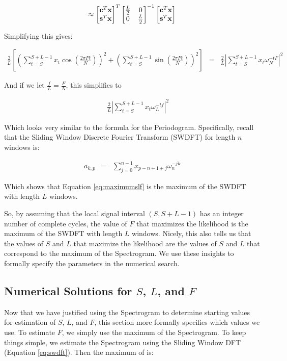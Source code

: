 \documentclass[11pt]{article}
\theoremstyle{plain}
\theoremstyle{definition}
\begin{document}
$$
\approx 
\begin{bmatrix}
{\bf c}^T {\bf x} \\
{\bf s}^T {\bf x} 
\end{bmatrix}^T
\begin{bmatrix}
\frac{L}{2} & 0\\ 
0 & \frac{L}{2}	
\end{bmatrix}^{-1}
\begin{bmatrix}
{\bf c}^T {\bf x} \\
{\bf s}^T {\bf x} 
\end{bmatrix}
$$

\noindent Simplifying this gives:

\begin{eqnarray}
	\frac{2}{L} [(\sum_{t=S}^{S+L-1} x_t \cos(\frac{2 \pi F t}{N}))^2 + (\sum_{t=S}^{S+L-1} \sin(\frac{2 \pi F t}{N}))^2]&=& \frac{2}{L} |\sum_{t=S}^{S+L-1} x_{t} \omega_N^{-tF}|^2 \nonumber 
\end{eqnarray}

\noindent And if we let $\frac{f}{L} = \frac{F}{N}$, this simplifies to

\begin{eqnarray} 
\label{eq:maximumslf}
	&& \frac{2}{L} | \sum_{t=S}^{S+L-1} x_t \omega_L^{-tf}|^2
\end{eqnarray}

\noindent Which looks very similar to the formula for the Periodogram. Specifically, recall that the Sliding Window Discrete Fourier Transform (SWDFT) for length $n$ windows is:

\begin{eqnarray}
\label{eq:swdft}
	a_{k, p} &=& \sum_{j=0}^{n-1} x_{p-n+1+j} \omega_n^{-jk}
\end{eqnarray}

\noindent Which shows that Equation \ref{eq:maximumslf} is the maximum of the SWDFT with length $L$ windows. 

So, by assuming that the local signal interval $(S, S+L-1)$ has an integer number of complete cycles, the value of $F$ that maximizes the likelihood is the maximum of the SWDFT with length $L$ windows. Nicely, this also tells us that the values of $S$ and $L$ that maximize the likelihood are the values of $S$ and $L$ that correspond to the maximum of the Spectrogram. We use these insights to formally specify the parameters in the numerical search. 

\subsection{Numerical Solutions for $S$, $L$, and $F$}
\label{sec:numericalslf}
Now that we have justified using the Spectrogram to determine starting values for estimation of $S$, $L$, and $F$, this section more formally specifies which values we use. To estimate $F$, we simply use the maximum of the Spectrogram. To keep things simple, we estimate the Spectrogram using the Sliding Window DFT (Equation \ref{eq:swdft}). Then the maximum of is:
\end{document}
